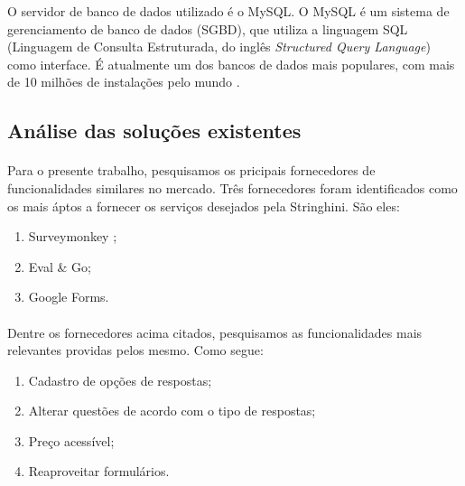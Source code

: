 \documentclass[11pt]{article}
\begin{document}
          O servidor de banco de dados utilizado é o MySQL. 
          O MySQL é um sistema de gerenciamento de banco de dados (SGBD), 
          que utiliza a linguagem SQL (Linguagem de Consulta Estruturada, 
          do inglês {\em Structured Query Language}) como interface. 
          É atualmente um dos bancos de dados mais populares, 
          com mais de 10 milhões de instalações pelo mundo \cite{website:mysql}.
  
  \clearpage
  
      \subsection{Análise das soluções existentes}

      \paragraph{}

      Para o presente trabalho, pesquisamos os pricipais fornecedores de 
      funcionalidades similares no mercado. Três fornecedores foram 
      identificados como os mais áptos a fornecer os serviços desejados
      pela Stringhini. São eles:

      \begin{enumerate}
        \item Surveymonkey \cite{website:surveymonkey};
        \item Eval \& Go\cite{website:evalgo};
        \item Google Forms\cite{website:googleforms}.
      \end{enumerate}

      \paragraph{}
      
      Dentre os fornecedores acima citados, pesquisamos as 
      funcionalidades mais relevantes providas pelos mesmo. Como segue:

      \begin{enumerate}
        \item Cadastro de opções de respostas;
        \item Alterar questões de acordo com o tipo de respostas;
        \item Preço acessível;
        \item Reaproveitar formulários.
      \end{enumerate}
\end{document}
